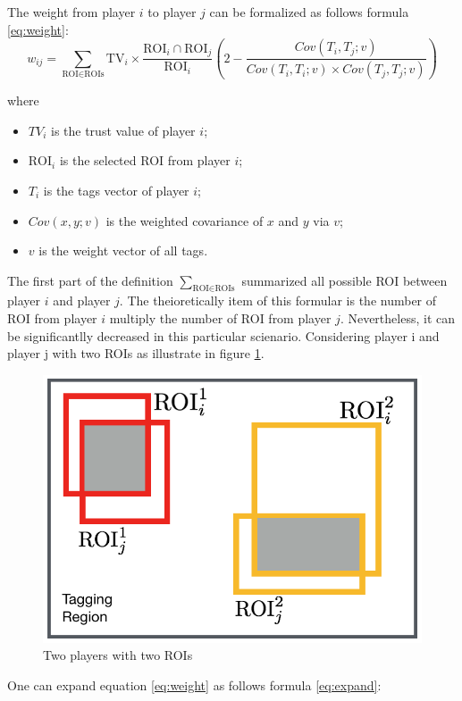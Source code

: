   \begin{definition}
  The weight from player $i$ to player $j$ can be formalized as follows formula \ref{eq:weight}:
  \begin{equation}
  \label{eq:weight}
  w_{ij} = 
  \sum_{\text{ROI}\in\text{ROIs}}{
    \text{TV}_i \times
    \frac{\text{ROI}_i\cap\text{ROI}_j}{\text{ROI}_i}
    \left( 2-\frac{Cov(T_i, T_j; v)}
        {Cov(T_i, T_i; v)\times Cov(T_j, T_j; v)} \right)
  }
  \end{equation}

  where 
  
  \begin{itemize}
    \item $TV_i$ is the trust value of player $i$;
    \item $\text{ROI}_i$ is the selected ROI from player $i$;
    \item $T_i$ is the tags vector of player $i$;
    \item $Cov(x, y; v)$ is the weighted covariance of $x$ and $y$ via $v$;
    \item $v$ is the weight vector of all tags.
  \end{itemize}
  \end{definition}

  The first part of the definition $\sum_{\text{ROI}\in\text{ROIs}}$ summarized all possible 
  ROI between player $i$ and player $j$. The theioretically item of this formular is the number
  of ROI from player $i$ multiply the number of ROI from player $j$. Nevertheless, it can be
  significantlly decreased in this particular scienario. Considering player i and player j 
  with two ROIs as illustrate in figure \ref{fig:performance}.

  \begin{figure}[htp]
  \centering
  \includegraphics[width=0.5\columnwidth]{figures/performance}
  \caption{Two players with two ROIs}
  \label{fig:performance}
  \end{figure}

  One can expand equation \ref{eq:weight} as follows formula \ref{eq:expand}:


